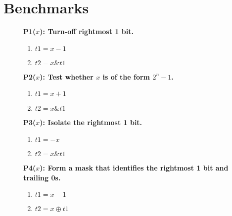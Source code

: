\documentclass[a4paper]{llncs}
\begin{document}
{}


\appendix

\section{Benchmarks}
\label{app:benchmarks}

\begin{figure}
\scriptsize
 \begin{multicols}{4}
 
   \begin{minipage}{.2\textwidth}
   \bf{P1}($x$): Turn-off rightmost 1 bit.
   \begin{enumerate}
    \item $t1 = x - 1$
    \item $t2 = x \& t1$
   \end{enumerate}
   \end{minipage}

   \vspace{12pt}
   
   \begin{minipage}{.2\textwidth}
   \bf{P2}($x$): Test whether $x$ is of the form $2^n - 1$.
   \begin{enumerate}
    \item $t1 = x + 1$
    \item $t2 = x \& t1$
   \end{enumerate}
   \end{minipage}

   \vspace{12pt}
   

   \begin{minipage}{.2\textwidth}
   \bf{P3}($x$): Isolate the rightmost 1 bit.
   \begin{enumerate}
    \item $t1 = -x$
    \item $t2 = x \& t1$
   \end{enumerate}
   \end{minipage}

   \vspace{12pt}
   

   \begin{minipage}{.2\textwidth}
   \bf{P4}($x$): Form a mask that identifies the rightmost 1 bit and trailing 0s.
   \begin{enumerate}
    \item $t1 = x - 1$
    \item $t2 = x \oplus t1$
   \end{enumerate}
   \end{minipage}


\end{multicols}
\end{figure}
\end{document}
